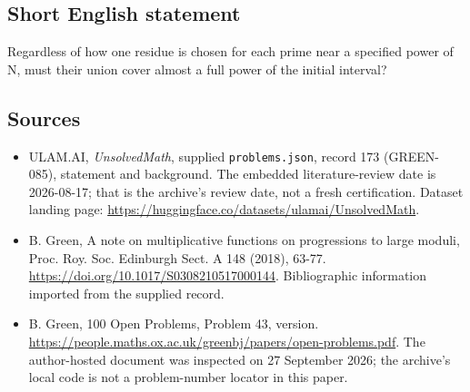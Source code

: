 \documentclass[11pt,a4paper]{article}
\begin{document}
\subsection{Short English statement}

Regardless of how one residue is chosen for each prime near a specified power of N, must their union cover almost a full power of the initial interval?

\subsection{Sources}

{\small

\begin{itemize}

\item[\hypertarget{source:173:1}{S1}] ULAM.AI, \emph{UnsolvedMath}, supplied \texttt{problems.json}, record 173 (GREEN-085), statement and background. The embedded literature-review date is 2026-08-17; that is the archive’s review date, not a fresh certification. Dataset landing page: \url{https://huggingface.co/datasets/ulamai/UnsolvedMath}.

\item[\hypertarget{source:173:2}{S2}] B. Green, A note on multiplicative functions on progressions to large moduli, Proc. Roy. Soc. Edinburgh Sect. A 148 (2018), 63-77. \url{https://doi.org/10.1017/S0308210517000144}. Bibliographic information imported from the supplied record.

\item[\hypertarget{source:173:3}{S3}] B. Green, 100 Open Problems, Problem 43, version. \url{https://people.maths.ox.ac.uk/greenbj/papers/open-problems.pdf}. The author-hosted document was inspected on 27 September 2026; the archive’s local code is not a problem-number locator in this paper.

\end{itemize}

}

\label{end:173}
\end{document}

